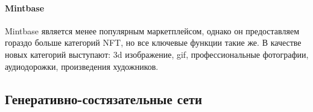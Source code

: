 \paragraph{Mintbase}

Mintbase является менее популярным маркетплейсом, однако он предоставляем гораздо больше категорий NFT, но все ключевые функции такие же. В качестве
новых категорий выступают: 3d изображение, gif, профессиональные фотографии, аудиодорожки, произведения художников.

\subsection{Генеративно-состязательные сети}
